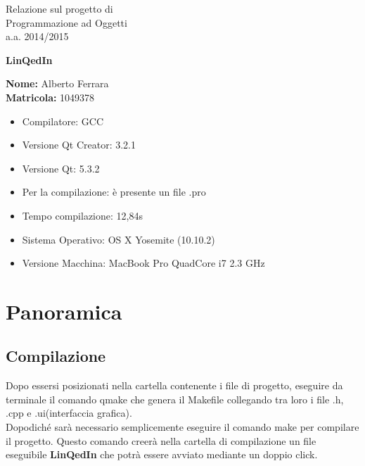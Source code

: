 \documentclass[openany, a4paper,11pt] {report}
\begin{document}
\begin{center}

\begin{Huge} Relazione sul progetto di \\ Programmazione ad Oggetti \\ a.a. 2014/2015 \\ \end{Huge}

\vfill

\begin{Huge} \textbf{LinQedIn} \end{Huge}

\vfill

\begin{Large} \textbf{Nome:} Alberto Ferrara \\ \textbf{Matricola:} 1049378 \end{Large}

\end{center}

\vfill


\begin{itemize}
\item \textsf{Compilatore: } GCC 
\item \textsf{Versione Qt Creator: } 3.2.1
\item \textsf{Versione Qt: } 5.3.2
\item \textsf{Per la compilazione: } è presente un file .pro
\item \textsf{Tempo compilazione: } 12,84s 
\item \textsf{Sistema Operativo: } OS X Yosemite (10.10.2)
\item \textsf{Versione Macchina: } MacBook Pro QuadCore i7 2.3 GHz
\end{itemize}

\tableofcontents

\chapter{Panoramica}
\section{Compilazione}

Dopo essersi posizionati nella cartella contenente i file di progetto, eseguire da terminale il comando \textsf{qmake} che genera il Makefile collegando tra loro i file \textsf{.h, .cpp e .ui(interfaccia grafica)}.\\
Dopodiché sarà necessario semplicemente eseguire il comando \textsf{make} per compilare il progetto. Questo comando creerà nella cartella di compilazione un file eseguibile \textbf{LinQedIn} che potrà essere avviato mediante un doppio click.
\end{document}
